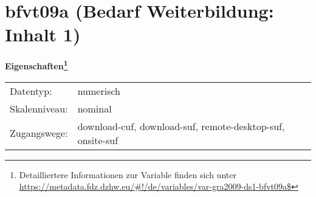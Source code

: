 
    \setcounter{footnote}{0}

    \vspace*{-1.8cm}
	\section{bfvt09a (Bedarf Weiterbildung: Inhalt 1)}
	\label{section:bfvt09a}



    \vspace*{0.5cm}
    \noindent\textbf{Eigenschaften\footnote{Detailliertere Informationen zur Variable finden sich unter
		\url{https://metadata.fdz.dzhw.eu/\#!/de/variables/var-gra2009-ds1-bfvt09a$}}}\\
	\begin{tabularx}{\hsize}{@{}lX}
	Datentyp: & numerisch \\
	Skalenniveau: & nominal \\
	Zugangswege: &
	  download-cuf, 
	  download-suf, 
	  remote-desktop-suf, 
	  onsite-suf
 \\
    \end{tabularx}



